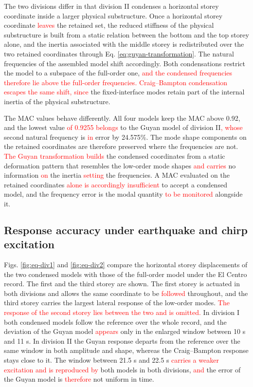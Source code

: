 \documentclass[11pt,a4paper]{article}
\numberwithin{equation}{section}
\newcommand{\rev}[1]{\textcolor{red}{#1}}
\begin{document}
The two divisions differ in that division II condenses a horizontal storey coordinate inside a larger physical substructure. Once a horizontal storey coordinate \rev{leaves} the retained set, the reduced stiffness of the physical substructure is built from a static relation between the bottom and the top storey alone, and the inertia associated with the middle storey is redistributed over the two retained coordinates through Eq. \eqref{eq:guyan-transformation}. The natural frequencies of the assembled model shift accordingly. Both condensations restrict the model to a subspace of the full-order one, \rev{and the condensed frequencies therefore lie above the full-order frequencies. Craig--Bampton condensation escapes the same shift, since} the fixed-interface modes retain part of the internal inertia of the physical substructure.

The MAC values behave differently. All four models keep the MAC above 0.92, and the lowest value\rev{ of 0.9255 belongs} to the Guyan model of division II\rev{, whose} second natural frequency is \rev{in} error by 24.575\%. The mode shape components on the retained coordinates are therefore preserved where the frequencies are not. \rev{The Guyan transformation builds} the condensed coordinates from a static deformation pattern that resembles the low-order mode shapes \rev{and carries} no information \rev{on} the inertia \rev{setting} the frequencies. A MAC evaluated on the retained coordinates \rev{alone is accordingly insufficient} to accept a condensed model, and the frequency error is the modal quantity \rev{to be monitored} alongside it.

\subsection{Response accuracy under earthquake and chirp excitation}
\label{sec:response-accuracy}

Figs. \ref{fig:eq-div1} and \ref{fig:eq-div2} compare the horizontal storey displacements of the two condensed models with those of the full-order model under the El Centro record. The first and the third storey are shown. The first storey is actuated in both divisions and allows the same coordinate to be \rev{followed} throughout, and the third storey carries the largest lateral response of the low-order modes. \rev{The response of the second storey lies between the two and is omitted.} In division I both condensed models follow the reference over the whole record, and the deviation of the Guyan model \rev{appears} only in the enlarged window between 10 s and 11 s. In division II the Guyan response departs from the reference over the same window in both amplitude and shape, whereas the Craig--Bampton response stays close to it. The window between 21.5 s and 22.5 s\rev{ carries a weaker excitation and is reproduced by} both models in both divisions, \rev{and} the error of the Guyan model is \rev{therefore} not uniform in time.
\end{document}
